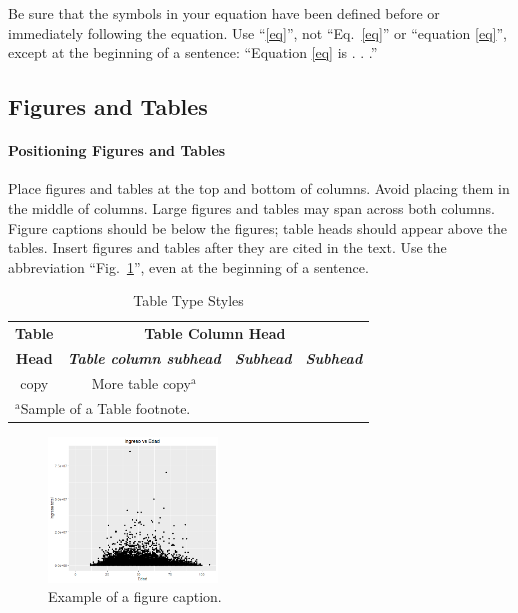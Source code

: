 \documentclass[conference, 10pt]{IEEEtran}
\begin{document}
Be sure that the 
symbols in your equation have been defined before or immediately following 
the equation. Use ``\eqref{eq}'', not ``Eq.~\eqref{eq}'' or ``equation \eqref{eq}'', except at 
the beginning of a sentence: ``Equation \eqref{eq} is . . .''



\subsection{Figures and Tables}
\paragraph{Positioning Figures and Tables} Place figures and tables at the top and 
bottom of columns. Avoid placing them in the middle of columns. Large 
figures and tables may span across both columns. Figure captions should be 
below the figures; table heads should appear above the tables. Insert 
figures and tables after they are cited in the text. Use the abbreviation 
``Fig.~\ref{fig}'', even at the beginning of a sentence.

\begin{table}[htbp]
\caption{Table Type Styles}
\begin{center}
\begin{tabular}{|c|c|c|c|}
\hline
\textbf{Table}&\multicolumn{3}{|c|}{\textbf{Table Column Head}} \\
\cline{2-4} 
\textbf{Head} & \textbf{\textit{Table column subhead}}& \textbf{\textit{Subhead}}& \textbf{\textit{Subhead}} \\
\hline
copy& More table copy$^{\mathrm{a}}$& &  \\
\hline
\multicolumn{4}{l}{$^{\mathrm{a}}$Sample of a Table footnote.}
\end{tabular}
\label{tab1}
\end{center}
\end{table}

\begin{figure}[htbp]
\centerline{\includegraphics[width=0.4\textwidth]{../Vistas/Rplot01.png}}
\caption{Example of a figure caption.}
\label{fig}
\end{figure}
\end{document}
